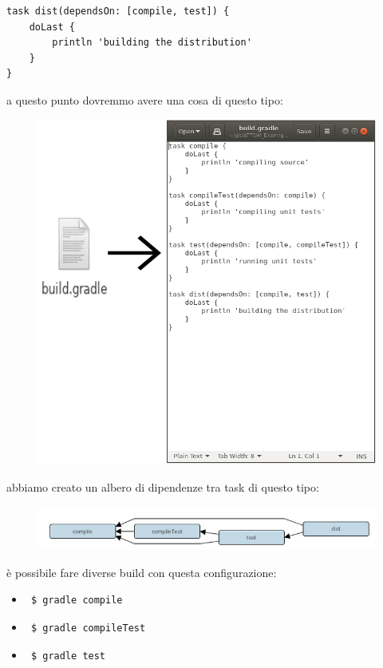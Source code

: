 \documentclass{article}
\begin{document}
\begin{flushleft}
\begin{verbatim}
task dist(dependsOn: [compile, test]) {
    doLast {
        println 'building the distribution'
    }
}
\end{verbatim}
a questo punto dovremmo avere una cosa di questo tipo:
\begin{figure}[H]
\includegraphics[scale=0.46]{gradleexamplefirst.png}
\end{figure} 
abbiamo creato un albero di dipendenze tra task di questo tipo:
\label{taskdip}
\begin{figure}[H]
\includegraphics[scale=0.70]{taskdipendence.png}
\end{figure}
è possibile fare diverse build con questa configurazione:
\begin{itemize}
    \item \begin{verbatim} $ gradle compile \end{verbatim}
    \item \begin{verbatim} $ gradle compileTest \end{verbatim}
    \item \begin{verbatim} $ gradle test \end{verbatim}

\end{itemize}
\end{flushleft}
\end{document}
